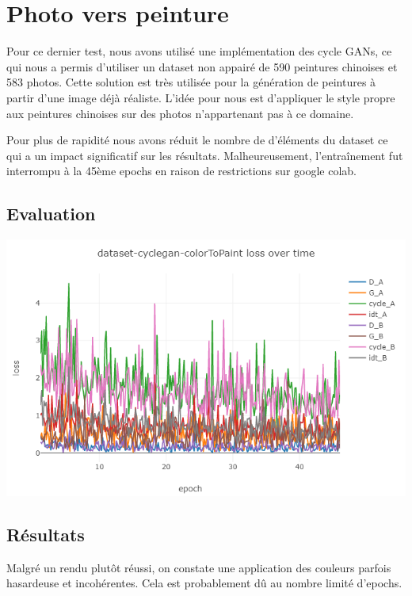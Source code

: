\documentclass[a4paper, 12pt]{report}
\begin{document}
\pagebreak

\section{Photo vers peinture}

Pour ce dernier test, nous avons utilisé une implémentation des cycle GANs, ce qui nous a permis d'utiliser un dataset non appairé de 590 peintures chinoises et 583 photos. Cette solution est très utilisée pour la génération de peintures à partir d'une image déjà réaliste. L'idée pour nous est d'appliquer le style propre aux peintures chinoises sur des photos n'appartenant pas à ce domaine. 

Pour plus de rapidité nous avons réduit le nombre de d'éléments du dataset ce qui a un impact significatif sur les résultats. Malheureusement, l'entraînement fut interrompu à la 45ème epochs en raison de restrictions sur google colab.

\subsection{Evaluation}
\begin{center}
  \centering
    \includegraphics[width=0.9\linewidth]{images/plot-cyclegan.png}
\end{center}


\subsection{Résultats}
Malgré un rendu plutôt réussi, on constate une application des couleurs parfois hasardeuse et incohérentes. Cela est probablement dû au nombre limité d'epochs.
\end{document}
